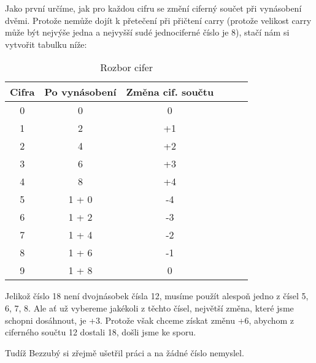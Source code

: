 \documentclass{fkssolpub}
\author{Ondřej Sedláček}
\begin{document}
Jako první určíme, jak pro každou cifru se změní ciferný součet při vynásobení
dvěmi. Protože nemůže dojít k přetečení při přičtení carry (protože velikost
carry může být nejvýše jedna a nejvyšší sudé jednociferné číslo je 8), stačí
nám si vytvořit tabulku níže:


\begin{table}[h!]
	\centering
	\begin{tabular}{|c|c|c|c|c|c|}
		\hline
		Cifra & Po vynásobení & Změna cif. součtu \\
		\hline
		0     & 0             & 0                 \\
		1     & 2             & +1                \\
		2     & 4             & +2                \\
		3     & 6             & +3                \\
		4     & 8             & +4                \\
		5     & 1 + 0         & -4                \\
		6     & 1 + 2         & -3                \\
		7     & 1 + 4         & -2                \\
		8     & 1 + 6         & -1                \\
		9     & 1 + 8         & 0                 \\
		\hline
	\end{tabular}
	\caption{Rozbor cifer}
\end{table}

Jelikož číslo 18 není dvojnásobek čísla 12, musíme použít alespoň jedno z čísel
5, 6, 7, 8. Ale ať už vybereme jakékoli z těchto čísel, největší změna, které
jsme schopni dosáhnout, je +3. Protože však chceme získat změnu +6, abychom z
ciferného součtu 12 dostali 18, došli jsme ke sporu.

Tudíž Bezzubý si zřejmě ušetřil práci a na žádné číslo nemyslel.
\end{document}
